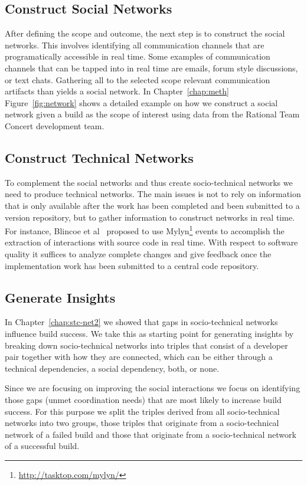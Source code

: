 \subsection{Construct Social Networks}
After  defining the scope and outcome, the next step is to construct the social networks.
This involves identifying all communication channels that are programatically accessible in real time.
Some examples of communication channels that can be tapped into in real time are emails, forum style discussions, or text chats.
Gathering all to the selected scope relevant communication artifacts than yields a social network.
In Chapter~\ref{chap:meth} Figure~\ref{fig:network} shows a detailed  example on how we construct a social network given a build as the scope of interest using data from the Rational Team Concert development team.

\subsection{Construct Technical Networks}
To complement the social networks and thus create socio-technical networks we need to produce technical networks.
The main issues is not to rely on information that is only available after the work has been completed and been submitted to a version repository, but to gather information to construct networks in real time.
For instance, Blincoe et al~\cite{blincoe:cscw:2012} proposed to use Mylyn\footnote{\url{http://tasktop.com/mylyn/}} events to accomplish the extraction of interactions with source code in real time.
With respect to software quality it suffices to analyze complete changes and give feedback once the implementation work has been submitted to a central code repository.

\subsection{Generate Insights}
In Chapter~\ref{chap:stc-net2} we showed that gaps in socio-technical networks influence build success.
We take this as starting point for generating insights by breaking down socio-technical networks into triples that consist of a developer pair together with how they are connected, which can be either through a technical dependencies, a social dependency, both, or none.

Since we are focusing on improving the social interactions we focus on identifying those gaps (unmet coordination needs) that are most likely to increase build success.
For this purpose we split the triples derived from all socio-technical networks into two groups, those triples that originate from a socio-technical network of a failed build and those that originate from a socio-technical network of a successful build.


